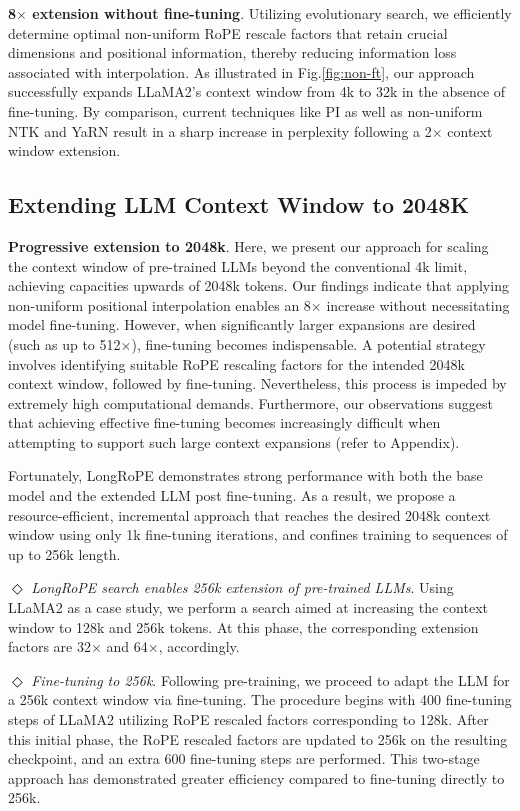 \textbf{8$\times$ extension without fine-tuning}. Utilizing evolutionary search, we efficiently determine optimal non-uniform RoPE rescale factors that retain crucial dimensions and positional information, thereby reducing information loss associated with interpolation. As illustrated in Fig.\ref{fig:non-ft}, our approach successfully expands LLaMA2’s context window from 4k to 32k in the absence of fine-tuning. By comparison, current techniques like PI as well as non-uniform NTK and YaRN result in a sharp increase in perplexity following a 2$\times$ context window extension.

\subsection{Extending LLM Context Window to 2048K}
\label{sec:extendto2048k}

\textbf{Progressive extension to 2048k}. Here, we present our approach for scaling the context window of pre-trained LLMs beyond the conventional 4k limit, achieving capacities upwards of 2048k tokens. Our findings indicate that applying non-uniform positional interpolation enables an 8$\times$ increase without necessitating model fine-tuning. However, when significantly larger expansions are desired (such as up to 512$\times$), fine-tuning becomes indispensable. A potential strategy involves identifying suitable RoPE rescaling factors for the intended 2048k context window, followed by fine-tuning. Nevertheless, this process is impeded by extremely high computational demands. Furthermore, our observations suggest that achieving effective fine-tuning becomes increasingly difficult when attempting to support such large context expansions (refer to Appendix).

Fortunately, LongRoPE demonstrates strong performance with both the base model and the extended LLM post fine-tuning. As a result, we propose a resource-efficient, incremental approach that reaches the desired 2048k context window using only 1k fine-tuning iterations, and confines training to sequences of up to 256k length.

$\Diamond$ \textit{LongRoPE search enables 256k extension of pre-trained LLMs}. Using LLaMA2 as a case study, we perform a search aimed at increasing the context window to 128k and 256k tokens. At this phase, the corresponding extension factors are 32$\times$ and 64$\times$, accordingly.

$\Diamond$ \textit{Fine-tuning to 256k}. Following pre-training, we proceed to adapt the LLM for a 256k context window via fine-tuning. The procedure begins with 400 fine-tuning steps of LLaMA2 utilizing RoPE rescaled factors corresponding to 128k. After this initial phase, the RoPE rescaled factors are updated to 256k on the resulting checkpoint, and an extra 600 fine-tuning steps are performed. This two-stage approach has demonstrated greater efficiency compared to fine-tuning directly to 256k.

